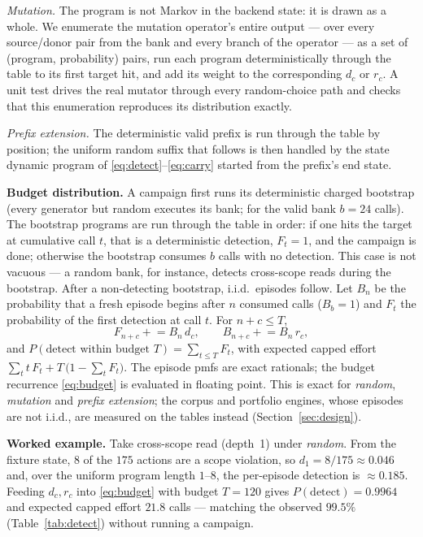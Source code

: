 \documentclass[conference]{IEEEtran}
\begin{document}
\emph{Mutation.} The program is not Markov in the backend state: it is drawn as a whole.
We enumerate the mutation operator's entire output --- over every source/donor pair from
the bank and every branch of the operator --- as a set of (program, probability) pairs,
run each program deterministically through the table to its first target hit, and add its
weight to the corresponding $d_c$ or $r_c$. A unit test drives the real mutator through
every random-choice path and checks that this enumeration reproduces its distribution
exactly.

\emph{Prefix extension.} The deterministic valid prefix is run through the table by
position; the uniform random suffix that follows is then handled by the state dynamic
program of \eqref{eq:detect}--\eqref{eq:carry} started from the prefix's end state.

\textbf{Budget distribution.} A campaign first runs its deterministic charged bootstrap
(every generator but random executes its bank; for the valid bank $b=24$ calls). The
bootstrap programs are run through the table in order: if one hits the target at
cumulative call $t$, that is a deterministic detection, $F_t=1$, and the campaign is done;
otherwise the bootstrap consumes $b$ calls with no detection. This case is not vacuous ---
a random bank, for instance, detects cross-scope reads during the bootstrap. After a
non-detecting bootstrap, i.i.d.\ episodes follow. Let $B_n$ be the probability that a fresh
episode begins after $n$ consumed calls ($B_b=1$) and $F_t$ the probability of the first
detection at call $t$. For $n+c\le T$,
\begin{equation}
F_{n+c}\mathrel{+}= B_n\,d_c, \qquad B_{n+c}\mathrel{+}= B_n\,r_c, \label{eq:budget}
\end{equation}
and $P(\text{detect within budget }T)=\sum_{t\le T} F_t$, with expected capped effort
$\sum_t t\,F_t + T\,\bigl(1-\sum_t F_t\bigr)$. The episode pmfs are exact rationals; the
budget recurrence \eqref{eq:budget} is evaluated in floating point. This is exact for
\emph{random}, \emph{mutation} and \emph{prefix extension}; the corpus and portfolio
engines, whose episodes are not i.i.d., are measured on the tables instead
(Section~\ref{sec:design}).

\textbf{Worked example.} Take cross-scope read (depth~1) under \emph{random}. From the
fixture state, $8$ of the $175$ actions are a scope violation, so $d_1=8/175\approx0.046$
and, over the uniform program length $1$--$8$, the per-episode detection is
$\approx0.185$. Feeding $d_c,r_c$ into \eqref{eq:budget} with budget $T=120$ gives
$P(\text{detect})=0.9964$ and expected capped effort $21.8$ calls --- matching the
observed $99.5\%$ (Table~\ref{tab:detect}) without running a campaign.
\end{document}
